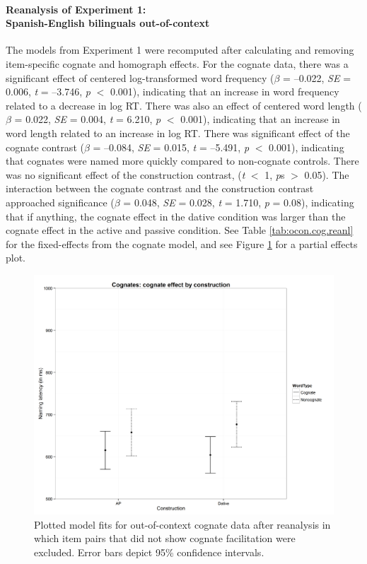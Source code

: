 \paragraph{Reanalysis of Experiment 1:\\ Spanish-English bilinguals out-of-context\\}
\label{reanalysisofexperiment1:spanish-englishbilingualsout-of-context}

The models from Experiment 1 were recomputed after calculating and removing item-specific cognate and homograph effects. For the cognate data, there was a significant effect of centered log-transformed word frequency (\emph{$\beta$} = --0.022, \emph{SE} = 0.006, \emph{t} = --3.746, \emph{p} $<$ 0.001), indicating that an increase in word frequency related to a decrease in log RT. There was also an effect of centered word length (\emph{$\beta$} = 0.022, \emph{SE} = 0.004, \emph{t} = 6.210, \emph{p} $<$ 0.001), indicating that an increase in word length related to an increase in log RT. There was significant effect of the cognate contrast (\emph{$\beta$} = --0.084, \emph{SE} = 0.015, \emph{t} = --5.491, \emph{p} $<$ 0.001), indicating that cognates were named more quickly compared to non-cognate controls. There was no significant effect of the construction contrast, (\emph{t} $<$ 1, \emph{p}s $>$ 0.05). The interaction between the cognate contrast and the construction contrast approached significance (\emph{$\beta$} = 0.048, \emph{SE} = 0.028, \emph{t} = 1.710, \emph{p} = 0.08), indicating that if anything, the cognate effect in the dative condition was larger than the cognate effect in the active and passive condition. See Table \ref{tab:ocon.cog.reanl} for the fixed-effects from the cognate model, and see Figure \ref{fig:conXwordtype-cogs-excluded} for a partial effects plot. 

\begin{figure}[htbp]
\centering
\includegraphics[width=\textwidth,height=\textheight,keepaspectratio]{conXwordtype-cogs-excluded.png}
\caption{Plotted model fits for out-of-context cognate data after reanalysis in which item pairs that did not show cognate facilitation were excluded. Error bars depict 95\% confidence intervals.}
\label{fig:conXwordtype-cogs-excluded}
\end{figure}

